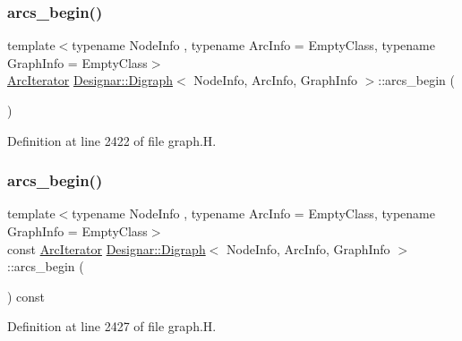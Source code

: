 \subsubsection{\texorpdfstring{arcs\+\_\+begin()}{arcs\_begin()}\hspace{0.1cm}{\footnotesize\ttfamily [1/4]}}
{\footnotesize\ttfamily template$<$typename Node\+Info , typename Arc\+Info  = Empty\+Class, typename Graph\+Info  = Empty\+Class$>$ \\
\hyperlink{class_designar_1_1_digraph_1_1_arc_iterator}{Arc\+Iterator} \hyperlink{class_designar_1_1_digraph}{Designar\+::\+Digraph}$<$ Node\+Info, Arc\+Info, Graph\+Info $>$\+::arcs\+\_\+begin (\begin{DoxyParamCaption}{ }\end{DoxyParamCaption})\hspace{0.3cm}{\ttfamily [inline]}}



Definition at line 2422 of file graph.\+H.

\mbox{\label{class_designar_1_1_digraph_a1334cd9030f2a409f03a611bb472f5cb}} 
\subsubsection{\texorpdfstring{arcs\+\_\+begin()}{arcs\_begin()}\hspace{0.1cm}{\footnotesize\ttfamily [2/4]}}
{\footnotesize\ttfamily template$<$typename Node\+Info , typename Arc\+Info  = Empty\+Class, typename Graph\+Info  = Empty\+Class$>$ \\
const \hyperlink{class_designar_1_1_digraph_1_1_arc_iterator}{Arc\+Iterator} \hyperlink{class_designar_1_1_digraph}{Designar\+::\+Digraph}$<$ Node\+Info, Arc\+Info, Graph\+Info $>$\+::arcs\+\_\+begin (\begin{DoxyParamCaption}{ }\end{DoxyParamCaption}) const\hspace{0.3cm}{\ttfamily [inline]}}



Definition at line 2427 of file graph.\+H.

\mbox{\label{class_designar_1_1_digraph_a3c1eeda482f59951e1191ea2e0dd514a}} 
